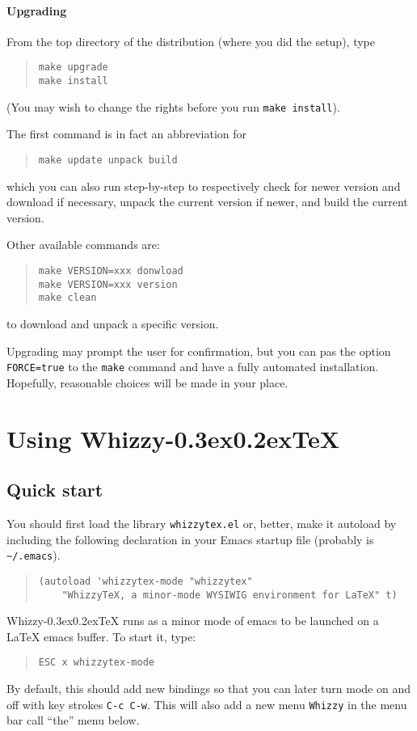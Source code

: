 \documentclass{article}
\makeatletter
\let \lst \verb
\def \whizzy {{Whizzy\kern -0.3ex\raise 0.2ex\hbox{\let \@\relax\TeX}}}
\makeatother
\begin{document}
\paragraph {Upgrading}
From the top directory of the distribution (where you did the setup), type 
\begin{quote}
\begin{verbatim}
make upgrade 
make install 
\end{verbatim}
\end{quote}
(You may wish to change the rights before you run \lst"make install"). 

The first command is in fact an abbreviation for
\begin{quote}
\begin{verbatim}
make update unpack build
\end{verbatim}
\end{quote}
which you can also run step-by-step to respectively
check for newer version and download if necessary, unpack
the current version if newer, and build the current version.

Other available commands are:
\begin{quote}
\begin{verbatim}
make VERSION=xxx donwload
make VERSION=xxx version
make clean
\end{verbatim}
\end{quote}
to download and unpack a specific version.

Upgrading may prompt the user for confirmation, but you can
pas the option \lst"FORCE=true" to the \lst"make" command and have
a fully automated installation. Hopefully, reasonable choices 
will be made in your place.


\section {Using {\whizzy}} 

\subsection {Quick start} 

You should first load the library \lst"whizzytex.el" or, better, make 
it autoload by including the following declaration 
in your Emacs startup file (probably  is \lst"~/.emacs"). 
\begin{quote}
\begin{verbatim}
(autoload 'whizzytex-mode "whizzytex" 
    "WhizzyTeX, a minor-mode WYSIWIG environment for LaTeX" t)
\end{verbatim}
\end{quote}
{\whizzy} runs as a minor mode of emacs to be launched on a {\LaTeX}
emacs buffer. To start it, type:
\begin{quote}
\begin{verbatim}
ESC x whizzytex-mode
\end{verbatim}
\end{quote}
By default, this should add new bindings so that you can later turn mode
on and off with key strokes {\tt C-c C-w}. This will also add a new menu
{\tt Whizzy} in the menu bar call ``the'' menu below.
\end{document}
